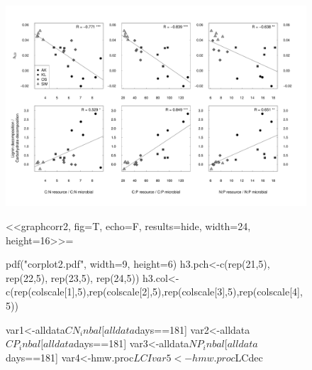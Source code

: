 \documentclass[10pt]{article}
\begin{document}
\begin{flushleft}
\newpage
\begin{figure}[h!]
\vspace*{2mm}
\begin{center}
\includegraphics{ligpaper-graphcorr}
\end{center}
\end{figure}

\newpage
\begin{figure}[h!]
\vspace*{2mm}
\begin{center}
    <<graphcorr2, fig=T, echo=F, results=hide, width=24, height=16>>=
    
pdf("corplot2.pdf", width=9, height=6)
h3.pch<-c(rep(21,5), rep(22,5), rep(23,5), rep(24,5))
h3.col<-c(rep(colscale[1],5),rep(colscale[2],5),rep(colscale[3],5),rep(colscale[4],5))


var1<-alldata$CN_inbal[alldata$days==181]
var2<-alldata$CP_inbal[alldata$days==181]
var3<-alldata$NP_inbal[alldata$days==181]
var4<-hmw.proc$LCI
var5<-hmw.proc$LCdec


\end{center}
\end{figure}
\end{flushleft}
\end{document}

